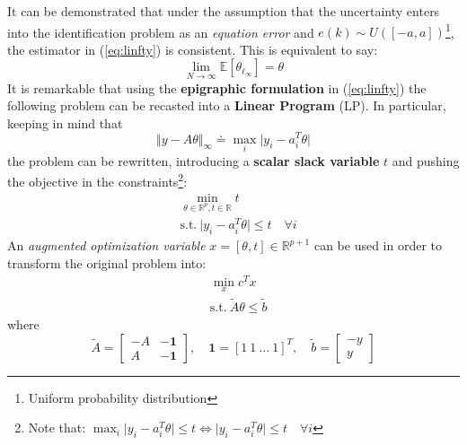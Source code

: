 It can be demonstrated that under the assumption that the uncertainty enters into the identification problem as an \textit{equation error} and $e(k)\sim{U([-a,a])}$\footnote{
    Uniform probability distribution
}, the estimator in (\ref{eq:linfty}) is consistent. This is equivalent to say:
\begin{equation*}
    \lim_{N\to\infty} {\mathbb{E}[\theta_{\ell_\infty}]}=\theta
\end{equation*}
It is remarkable that using the \textbf{epigraphic formulation} in (\ref{eq:linfty}) the following problem can be recasted into a \textbf{Linear Program} (LP). In particular, keeping in mind that
\begin{equation*}
    \Vert y-A\theta \Vert_\infty \doteq \max_i {\vert y_i-a_i^T\theta \vert}
\end{equation*}
the problem can be rewritten, introducing a \textbf{scalar slack variable} $t$ and pushing the objective in the constraints\footnote{
    Note that: $\max_i {\vert y_i-a_i^T\theta \vert} \le t \iff\vert y_i-a_i^T\theta \vert \le t \quad \forall i $
}:
\begin{equation}
    \begin{aligned}
        &\min_{\theta\in\mathbb{R}^p, t\in\mathbb{R}} t\\
        &\text{s.t.} \ 
         \vert y_i-a_i^T\theta \vert \le t \quad \forall i 
    \end{aligned}
\end{equation} 
An \textit{augmented optimization variable} $x=[\theta, t]\in\mathbb{R}^{p+1}$ can be used in order to transform the original problem into: 
\begin{equation}\label{eq:LP_prob}
    \begin{aligned}
        &\min_{x} c^T{x}\\
        &\text{s.t.} \ \tilde{A}\theta\le{\tilde{b}}
    \end{aligned}
\end{equation}
where 
\begin{equation}
    \tilde{A}=\begin{bmatrix}
        -A&-\mathbf{1}\\
        A&\mathbf{-1}
    \end{bmatrix}, \quad
    \mathbf{1} = [1\ 1 \ ... \ 1]^T, \quad
    \tilde{b}=\begin{bmatrix}
        -y\\
        y
    \end{bmatrix}
\end{equation}

